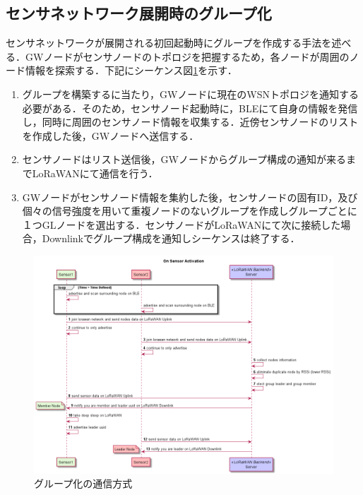 \subsection{センサネットワーク展開時のグループ化}
センサネットワークが展開される初回起動時にグループを作成する手法を述べる．GWノードがセンサノードのトポロジを把握するため，各ノードが周囲のノード情報を探索する．下記にシーケンス図\ref{fig:group_on_activation}を示す．

\begin{enumerate}
    \item グループを構築するに当たり，GWノードに現在のWSNトポロジを通知する必要がある．そのため，センサノード起動時に，BLEにて自身の情報を発信し，同時に周囲のセンサノード情報を収集する．近傍センサノードのリストを作成した後，GWノードへ送信する．
    \item センサノードはリスト送信後，GWノードからグループ構成の通知が来るまでLoRaWANにて通信を行う．
    \item GWノードがセンサノード情報を集約した後，センサノードの固有ID，及び個々の信号強度を用いて重複ノードのないグループを作成しグループごとに１つGLノードを選出する．センサノードがLoRaWANにて次に接続した場合，Downlinkでグループ構成を通知しシーケンスは終了する．
\end{enumerate}

\begin{figure}[]
    \begin{center}
    \includegraphics[width=14cm]{figures/グループ化_センサ起動時.png}
    \caption{グループ化の通信方式}
    \label{fig:group_on_activation}
    \end{center}
\end{figure}
